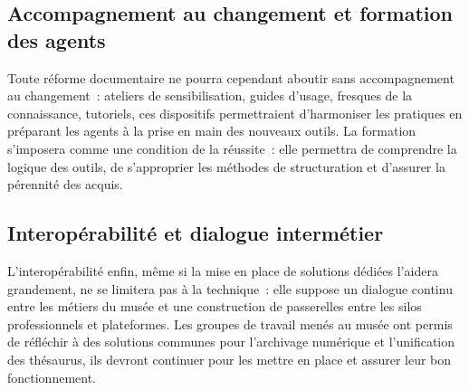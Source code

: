 \subsection{Accompagnement au changement et formation des agents}



Toute réforme documentaire ne pourra cependant aboutir sans accompagnement au changement~: ateliers de sensibilisation, guides d’usage, fresques de la connaissance, tutoriels, ces dispositifs permettraient d'harmoniser les pratiques en préparant les agents à la prise en main des nouveaux outils. La formation s'imposera comme une condition de la réussite~: elle permettra de comprendre la logique des outils, de s’approprier les méthodes de structuration et d’assurer la pérennité des acquis.



\subsection{Interopérabilité et dialogue intermétier}



L’interopérabilité enfin, même si la mise en place de solutions dédiées l'aidera grandement, ne se limitera pas à la technique~: elle suppose un dialogue continu entre les métiers du musée et une construction de passerelles entre les silos professionnels et plateformes. Les groupes de travail menés au musée ont permis de réfléchir à des solutions communes pour l’archivage numérique et l'unification des thésaurus, ils devront continuer pour les mettre en place et assurer leur bon fonctionnement. 

